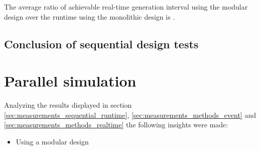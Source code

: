 The average ratio of achievable real-time generation interval using the modular design over the runtime using the monolithic design is . %

\subsection{Conclusion of sequential design tests}

\section{Parallel simulation}
\label{sec:measurements_parallel}
\label{sec:measurements_sequential_conclusion}

Analyzing the results displayed in section \ref{sec:measurements_sequential_runtime}, \ref{sec:measurements_methods_event} and \ref{sec:measurements_methods_realtime} the following insights were made:

\begin{itemize}
    \item Using a modular design
\end{itemize}